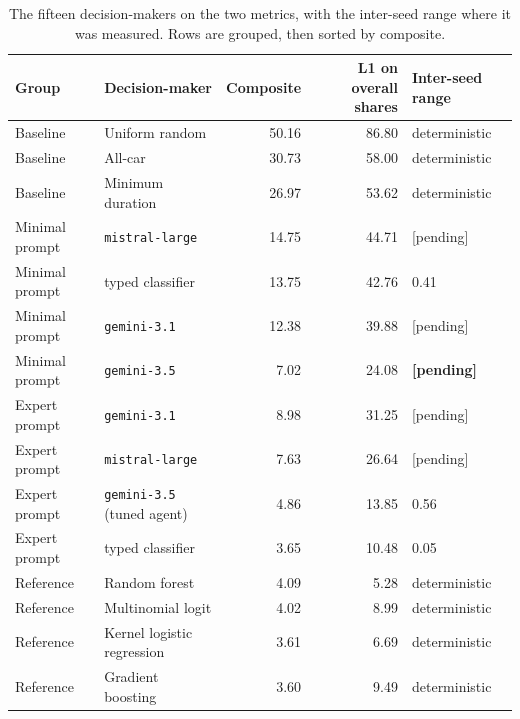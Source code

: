\begin{table}[tp]
  \caption{The fifteen decision-makers on the two metrics, with the inter-seed range where it was measured. Rows are grouped, then sorted by composite.}
  \label{tab:scale}
  \begin{tabular}{llrrl}
    \toprule
    Group & Decision-maker & Composite & L1 on overall shares & Inter-seed range \\
    \midrule
    Baseline       & Uniform random                         & 50.16 & 86.80 & deterministic \\
    Baseline       & All-car                                & 30.73 & 58.00 & deterministic \\
    Baseline       & Minimum duration                       & 26.97 & 53.62 & deterministic \\
    Minimal prompt & \texttt{mistral-large}                 & 14.75 & 44.71 & [pending] \\
    Minimal prompt & typed classifier                       & 13.75 & 42.76 & 0.41 \\
    Minimal prompt & \texttt{gemini-3.1}                    & 12.38 & 39.88 & [pending] \\
    Minimal prompt & \texttt{gemini-3.5}                    &  7.02 & 24.08 & \textbf{[pending]} \\
    Expert prompt  & \texttt{gemini-3.1}                    &  8.98 & 31.25 & [pending] \\
    Expert prompt  & \texttt{mistral-large}                 &  7.63 & 26.64 & [pending] \\
    Expert prompt  & \texttt{gemini-3.5} (tuned agent)      &  4.86 & 13.85 & 0.56 \\
    Expert prompt  & typed classifier                       &  3.65 & 10.48 & 0.05 \\
    Reference      & Random forest                          &  4.09 &  5.28 & deterministic \\
    Reference      & Multinomial logit                      &  4.02 &  8.99 & deterministic \\
    Reference      & Kernel logistic regression             &  3.61 &  6.69 & deterministic \\
    Reference      & Gradient boosting                      &  3.60 &  9.49 & deterministic \\
    \bottomrule
  \end{tabular}
\end{table}

